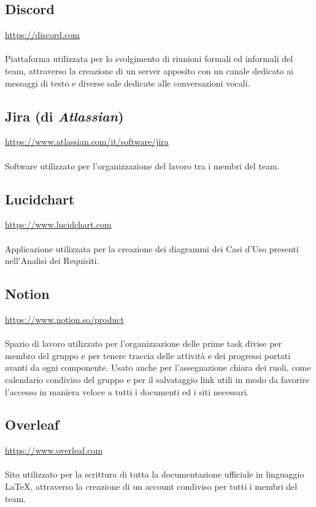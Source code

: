 \documentclass[10pt, a4paper]{article}
\begin{document}
\subsection{Discord}
\href{https://discord.com}{https://discord.com}\\\\
Piattaforma utilizzata per lo svolgimento di riunioni formali ed informali del team, attraverso la creazione di un server apposito con un canale dedicato ai messaggi di testo e diverse sale dedicate alle conversazioni vocali.

\subsection{Jira (di \textit{Atlassian})}
\href{https://www.atlassian.com/it/software/jira}{https://www.atlassian.com/it/software/jira}\\\\
Software utilizzato per l'organizzazione del lavoro tra i membri del team.


\subsection{Lucidchart}
\href{https://www.lucidchart.com/pages/it/landing?utm_source=google&utm_medium=cpc&utm_campaign=_chart_it_allcountries_mixed_search_brand_exact_&km_CPC_CampaignId=9594860760&km_CPC_AdGroupID=99270039979&km_CPC_Keyword=lucidchart&km_CPC_MatchType=e&km_CPC_ExtensionID=&km_CPC_Network=g&km_CPC_AdPosition=&km_CPC_Creative=424699413281&km_CPC_TargetID=kwd-33511936169&km_CPC_Country=1008611&km_CPC_Device=c&km_CPC_placement=&km_CPC_target=&gad_source=1&gclid=CjwKCAiAu9yqBhBmEiwAHTx5p4TQe0-7u0ZhVN-N_fc86zgphNfT-Tl5YNwSklJXC8E3NH5yE9t0HRoCnmAQAvD_BwE}{https://www.lucidchart.com}\\\\
Applicazione utilizzata per la creazione dei diagrammi dei Casi d'Uso presenti nell'Analisi dei Requisiti.

\subsection{Notion}
\href{https://www.notion.so/product}{https://www.notion.so/product}\\\\
Spazio di lavoro utilizzato per l’organizzazione delle prime task divise per membro del gruppo e per tenere traccia delle attività e dei progressi portati avanti da ogni componente. Usato anche per l’assegnazione chiara dei ruoli, come calendario condiviso del gruppo e per il salvataggio link utili in modo da favorire l’accesso in maniera veloce a tutti i documenti ed i siti necessari.

\subsection{Overleaf}
\href{https://www.overleaf.com}{https://www.overleaf.com}\\\\
Sito utilizzato per la scrittura di tutta la documentazione ufficiale in linguaggio LaTeX, attraverso la creazione di un account condiviso per tutti i membri del team.
\end{document}
